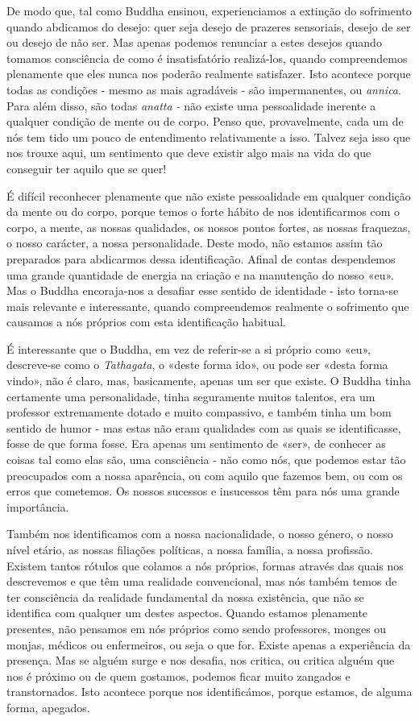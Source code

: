 De modo que, tal como Buddha ensinou, experienciamos a extinção do
sofrimento quando abdicamos do desejo: quer seja desejo de prazeres
sensoriais, desejo de ser ou desejo de não ser. Mas apenas podemos
renunciar a estes desejos quando tomamos consciência de como é
insatisfatório realizá-los, quando compreendemos plenamente que eles
nunca nos poderão realmente satisfazer. Isto acontece porque todas as
condições - mesmo as mais agradáveis - são impermanentes, ou
\emph{annica}. Para além disso, são todas \emph{anatta -} não existe uma
pessoalidade inerente a qualquer condição de mente ou de corpo. Penso
que, provavelmente, cada um de nós tem tido um pouco de entendimento
relativamente a isso. Talvez seja isso que nos trouxe aqui, um
sentimento que deve existir algo mais na vida do que conseguir ter
aquilo que se quer!

É difícil reconhecer plenamente que não existe pessoalidade em qualquer
condição da mente ou do corpo, porque temos o forte hábito de nos
identificarmos com o corpo, a mente, as nossas qualidades, os nossos
pontos fortes, as nossas fraquezas, o nosso carácter, a nossa
personalidade. Deste modo, não estamos assim tão preparados para
abdicarmos dessa identificação. Afinal de contas despendemos uma grande
quantidade de energia na criação e na manutenção do nosso «eu». Mas o
Buddha encoraja-nos a desafiar esse sentido de identidade - isto
torna-se mais relevante e interessante, quando compreendemos realmente o
sofrimento que causamos a nós próprios com esta identificação habitual.

É interessante que o Buddha, em vez de referir-se a si próprio como
«eu», descreve-se como o \emph{Tathagata}, o «deste forma ido», ou pode
ser «desta forma vindo», não é claro, mas, basicamente, apenas um ser
que existe. O Buddha tinha certamente uma personalidade, tinha
seguramente muitos talentos, era um professor extremamente dotado e
muito compassivo, e também tinha um bom sentido de humor - mas estas não
eram qualidades com as quais se identificasse, fosse de que forma fosse.
Era apenas um sentimento de «ser», de conhecer as coisas tal como elas
são, uma consciência - não como nós, que podemos estar tão preocupados
com a nossa aparência, ou com aquilo que fazemos bem, ou com os erros
que cometemos. Os nossos sucessos e insucessos têm para nós uma grande
importância.

Também nos identificamos com a nossa nacionalidade, o nosso género, o
nosso nível etário, as nossas filiações políticas, a nossa família, a
nossa profissão. Existem tantos rótulos que colamos a nós próprios,
formas através das quais nos descrevemos e que têm uma realidade
convencional, mas nós também temos de ter consciência da realidade
fundamental da nossa existência, que não se identifica com qualquer um
destes aspectos. Quando estamos plenamente presentes, não pensamos em
nós próprios como sendo professores, monges ou monjas, médicos ou
enfermeiros, ou seja o que for. Existe apenas a experiência da presença.
Mas se alguém surge e nos desafia, nos critica, ou critica alguém que
nos é próximo ou de quem gostamos, podemos ficar muito zangados e
transtornados. Isto acontece porque nos identificámos, porque estamos,
de alguma forma, apegados.

